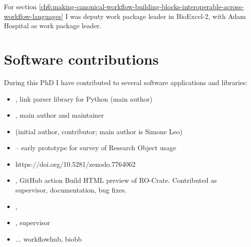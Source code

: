For section \ref{ch6:making-canonical-workflow-building-blocks-interoperable-across-workflow-languages} I was deputy work package leader in BioExcel-2, with Adam
Hospital as work package leader.



\section{Software contributions}

During this PhD I have contributed to several software applications and libraries:

\begin{itemize}
  \item  {}, link parser library for Python \cite{10.5281/zenodo.7256713}  (main author)
  \item  {}, main author and maintainer
  \item  {} \cite{ro-crate-py} (initial author, contributor; main author is Simone Leo)
  \item  {} --  early prototype for survey of Research Object usage
  \item  {} https://doi.org/10.5281/zenodo.7764062
  \item  {}, GitHub action Build HTML preview of RO-Crate. Contributed as supervisor, documentation, bug fixes.
  \item  {} \cite{cwlviewer}, 
  \item {}, supervisor
  
  \item ... workflowhub, biobb
\end{itemize}

